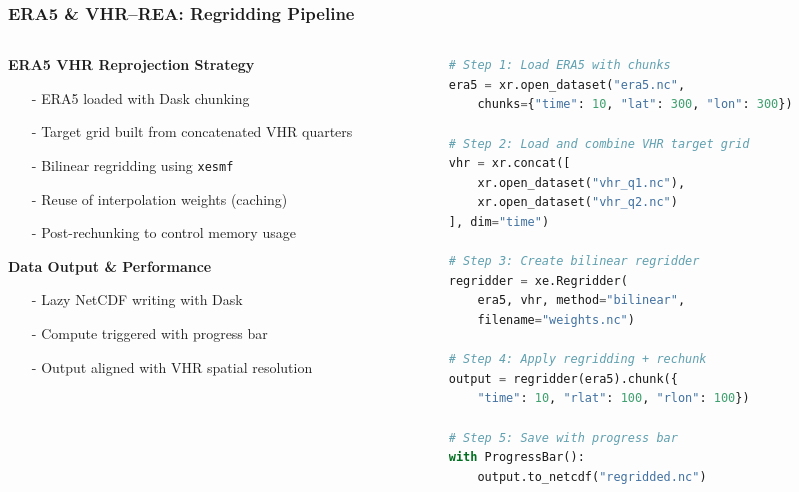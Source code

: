 \documentclass[footline=authortitle]{beamer}
\begin{document}
\begin{frame}[fragile]
\frametitle{ERA5 \& VHR--REA: Regridding Pipeline}

\tiny
\begin{columns}
\begin{column}{0.42\textwidth}
\textbf{ERA5 \textrightarrow{} VHR Reprojection Strategy}
\begin{itemize}
    \item[-] ERA5 loaded with Dask chunking
    \item[-] Target grid built from concatenated VHR quarters
    \item[-] Bilinear regridding using \texttt{xesmf}
    \item[-] Reuse of interpolation weights (caching)
    \item[-] Post-rechunking to control memory usage
\end{itemize}

\vspace{0.3cm}

\textbf{Data Output \& Performance}
\begin{itemize}
    \item[-] Lazy NetCDF writing with Dask
    \item[-] Compute triggered with progress bar
    \item[-] Output aligned with VHR spatial resolution
\end{itemize}
\end{column}

\begin{column}{0.58\textwidth}
\begin{lstlisting}[language=Python, basicstyle=\ttfamily\tiny]
# Step 1: Load ERA5 with chunks
era5 = xr.open_dataset("era5.nc",
    chunks={"time": 10, "lat": 300, "lon": 300})

# Step 2: Load and combine VHR target grid
vhr = xr.concat([
    xr.open_dataset("vhr_q1.nc"),
    xr.open_dataset("vhr_q2.nc")
], dim="time")

# Step 3: Create bilinear regridder
regridder = xe.Regridder(
    era5, vhr, method="bilinear",
    filename="weights.nc")

# Step 4: Apply regridding + rechunk
output = regridder(era5).chunk({
    "time": 10, "rlat": 100, "rlon": 100})

# Step 5: Save with progress bar
with ProgressBar():
    output.to_netcdf("regridded.nc")
\end{lstlisting}
\end{column}
\end{columns}
\end{frame}
\end{document}
